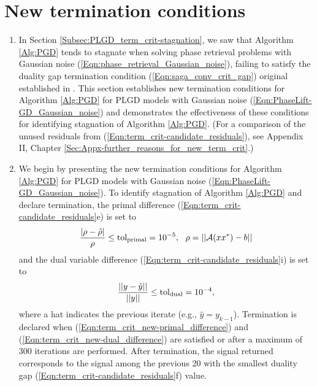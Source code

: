 \section{New termination conditions}  	\label{Subsec:PLGD_term_crit-new_term_crit}

\begin{enumerate}

\item

In Section \ref{Subsec:PLGD_term_crit-stagnation}, we saw that Algorithm \ref{Alg:PGD} tends to stagnate when solving phase retrieval problems with Gaussian noise (\ref{Eqn:phase_retrieval_Gaussian_noise}), failing to satisfy the duality gap termination condition (\ref{Eqn:saga_conv_crit_gap}) original established in \cite{DBLP:journals/siamsc/FriedlanderM16}.  
This section establishes new termination conditions for Algorithm \ref{Alg:PGD} for PLGD models with Gaussian noise (\ref{Eqn:PhaseLift-GD_Gaussian_noise}) and demonstrates the effectiveness of these conditions for identifying stagnation of Algorithm \ref{Alg:PGD}.  
(For a comparison of the unused residuals from (\ref{Eqn:term_crit-candidate_residuals}), see Appendix II, Chapter \ref{Sec:Appx-further_reasons_for_new_term_crit}.)





\item

We begin by presenting the new termination conditions for Algorithm \ref{Alg:PGD} for PLGD models with Gaussian noise (\ref{Eqn:PhaseLift-GD_Gaussian_noise}).  To identify stagnation of Algorithm \ref{Alg:PGD} and declare termination, the primal difference (\ref{Eqn:term_crit-candidate_residuals}e) is set to 
\begin{equation}
	\label{Eqn:term_crit_new-primal_difference}
\frac{| \rho - \hat{\rho} |}{\rho} \leq  \textnormal{tol}_\textnormal{primal} = 10^{-5}, \ \ \rho = ||{\mathcal A}(xx^*) - b||
\end{equation}
and the dual variable difference (\ref{Eqn:term_crit-candidate_residuals}i) is set to
\begin{equation}
	\label{Eqn:term_crit_new-dual_difference}
\frac{||y- \hat{y}||}{||y||} \leq \textnormal{tol}_\textnormal{dual}= 10^{-4},
\end{equation}
where a hat indicates the previous iterate (e.g., $\hat{y} = y_{k-1}$).  Termination is declared when (\ref{Eqn:term_crit_new-primal_difference}) and (\ref{Eqn:term_crit_new-dual_difference}) are satisfied or after a maximum of 300 iterations are performed.  After termination, the signal returned corresponds to the signal among the previous 20 with the smallest duality gap (\ref{Eqn:term_crit-candidate_residuals}f) value.  









\end{enumerate}
